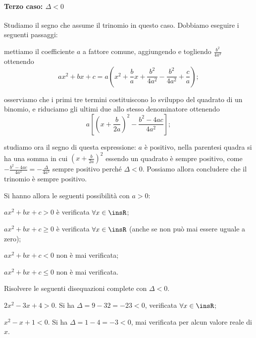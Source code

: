\paragraph{Terzo caso: $\Delta <0$} Studiamo il segno che assume il trinomio in questo caso. Dobbiamo eseguire i seguenti passaggi:

\begin{itemize*}
\item mettiamo il coefficiente $a$ a fattore comune, aggiungendo e togliendo $\frac{b^2} {4a^2}$ ottenendo 
\[{ax}^2+{bx}+c=a\left(x^2+\frac b ax+\frac{b^2} {4a^2}-\frac{b^2} {4a^2}+\frac c a\right);\]
\item osserviamo che i primi tre termini costituiscono lo sviluppo del quadrato di un binomio, e riduciamo gli ultimi due allo stesso denominatore ottenendo 
\[a\left[\left(x+\frac b {2a}\right)^2-\frac{b^2-4{ac}} {4a^2}\right];\]
\item studiamo ora il segno di questa espressione: $a$ è positivo, nella parentesi quadra si ha una somma in cui $\left(x+\frac b {2a}\right)^2$ essendo un quadrato è sempre positivo, come $-\frac{b^2-4{ac}} {4a^2}=-\frac{\Delta } {4a^2}$ sempre positivo perché $\Delta <0$. Possiamo allora concludere che il trinomio è sempre positivo.
\end{itemize*}
Si hanno allora le seguenti possibilità con $a>0$:

\begin{itemize*}
\item ${ax}^2+{bx}+c>0$ è verificata $\forall x\in \insR$;
\item ${ax}^2+{bx}+c\ge 0$ è verificata $\forall x\in \insR$ (anche se non può mai essere uguale a zero);
\item ${ax}^2+{bx}+c<0$ non è mai verificata;
\item ${ax}^2+{bx}+c\le 0$ non è mai verificata.
\end{itemize*}

\begin{exrig}
\begin{esempio}
Risolvere le seguenti disequazioni complete con $\Delta<0$.
\begin{itemize*}
\item $2x^2-3x+4>0$. Si ha $\Delta =9-32=-23<0$, verificata $\forall x\in \insR$;
\item $x^2-x+1<0$. Si ha $\Delta =1-4=-3<0$, mai verificata per alcun valore reale di $x$.
\end{itemize*}
\end{esempio}
\end{exrig}

